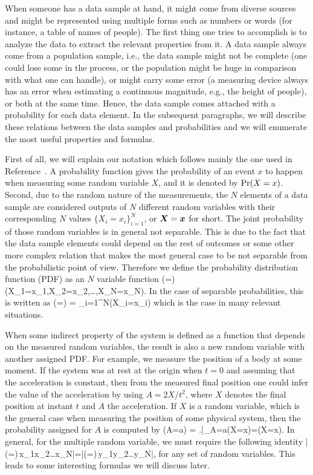 When someone has a data sample at hand, it might come from diverse sources and might be represented using multiple forms such as numbers or words (for instance, a table of names of people).
The first thing one tries to accomplish is to analyze the data to extract the relevant properties from it.
A data sample always come from a population sample, i.e., the data sample might not be complete (one could lose some in the process, or the population might be huge in comparison with what one can handle), or might carry some error (a measuring device always has an error when estimating a continuous magnitude, e.g., the height of people), or both at the same time.
Hence, the data sample comes attached with a probability for each data element.
In the subsequent paragraphs, we will describe these relations between the data samples and probabilities and we will enumerate the most useful properties and formulas.

First of all, we will explain our notation which follows mainly the one used in Reference~\citep{Riley2006}.
A probability function gives the probability of an event $x$ to happen when measuring some random variable $X$, and it is denoted by $\text{Pr}(X=x)$.
Second, due to the random nature of the measurements, the $N$ elements of a data sample are considered outputs of $N$ different random variables with their corresponding $N$ values $\{X_i=x_i\}_{i=1}^N$, or $\boldsymbol{X}=\boldsymbol{x}$ for short.
The joint probability of those random variables is in general not separable.
This is due to the fact that the data sample elements could depend on the rest of outcomes or some other more complex relation that makes the most general case to be not separable from the probabilistic point of view.
Therefore we define the probability distribution function (PDF) as an $N$ variable function
\be
  \prob(=) \equiv \prob(X_1=x_1,X_2=x_2,\dots,X_N=x_N).
\ee
In the case of separable probabilities, this is written as
\be
  \label{eq:bg-separable-likelyhood}
  \prob(=) = \prod_{i=1}^N\prob(X_i=x_i)
\ee
which is the case in many relevant situations.

When some indirect property of the system is defined as a function that depends on the measured random variables, the result is also a new random variable with another assigned PDF.
For example, we measure the position of a body at some moment.
If the system was at rest at the origin when $t=0$ and assuming that the acceleration is constant, then from the measured final position one could infer the value of the acceleration by using $A=2X/t^2$, where $X$ denotes the final position at instant $t$ and $A$ the acceleration.
If $X$ is a random variable, which is the general case when measuring the position of some physical system, then the probability assigned for $A$ is computed by
\be
  \prob(A=a) = \left.\right|_{A=a}\prob(X=x)=\prob(X=x).
\ee
In general, for the multiple random variable, we must require the following identity
\be
  |\prob(=)\,x_1x_2\dots{}x_N|=|\prob(=)\,y_1y_2\dots{}y_N|,
\ee
for any set of random variables.
This leads to some interesting formulas we will discuss later.

